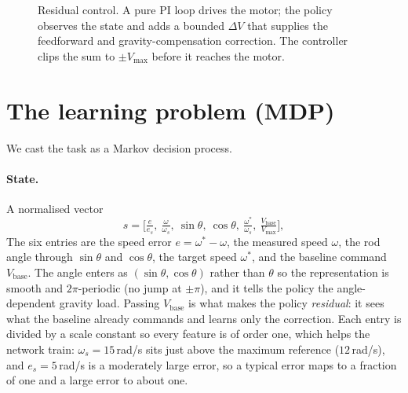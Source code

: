 \documentclass[10pt,twocolumn]{article}
\begin{document}
\begin{figure}[t]
\centering
{}
\caption{Residual control. A pure PI loop drives the motor; the policy
observes the state and adds a bounded $\Delta V$ that supplies the
feedforward and gravity-compensation correction. The controller clips
the sum to $\pm V_{\max}$ before it reaches the motor.}
\label{fig:loop}
\end{figure}

\section{The learning problem (MDP)}
We cast the task as a Markov decision process.

\paragraph{State.} A normalised vector
\begin{equation}
  s = \Big[\tfrac{e}{e_s},\ \tfrac{\omega}{\omega_s},\
  \sin\theta,\ \cos\theta,\ \tfrac{\omega^\ast}{\omega_s},\
  \tfrac{V_{\mathrm{base}}}{V_{\max}}\Big],
  \label{eq:state}
\end{equation}
The six entries are the speed error $e=\omega^\ast-\omega$, the measured
speed $\omega$, the rod angle through $\sin\theta$ and $\cos\theta$, the
target speed $\omega^\ast$, and the baseline command $V_{\mathrm{base}}$.
The angle enters as $(\sin\theta,\cos\theta)$ rather than $\theta$ so the
representation is smooth and $2\pi$-periodic (no jump at $\pm\pi$), and it
tells the policy the angle-dependent gravity load. Passing
$V_{\mathrm{base}}$ is what makes the policy \emph{residual}: it sees what
the baseline already commands and learns only the correction. Each entry
is divided by a scale constant so every feature is of order one, which
helps the network train: $\omega_s=15$\,rad/s sits just above the maximum
reference ($12$\,rad/s), and $e_s=5$\,rad/s is a moderately large error,
so a typical error maps to a fraction of one and a large error to about
one.
\end{document}
